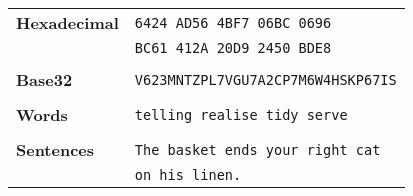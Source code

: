 \begin{tabular}{ll}
    \toprule
    \textbf{Hexadecimal} & \verb|6424 AD56 4BF7 06BC 0696|      \\
                            & \verb|BC61 412A 20D9 2450 BDE8|      \\
    \\
    \textbf{Base32} & \verb|V623MNTZPL7VGU7A2CP7M6W4HSKP67IS|   \\
    \\
    \textbf{Words} & \verb|telling realise tidy serve|          \\
    \\
    \textbf{Sentences} & \verb|The basket ends your right cat| \\
                        & \verb|on his linen.|\\
    \bottomrule
\end{tabular}